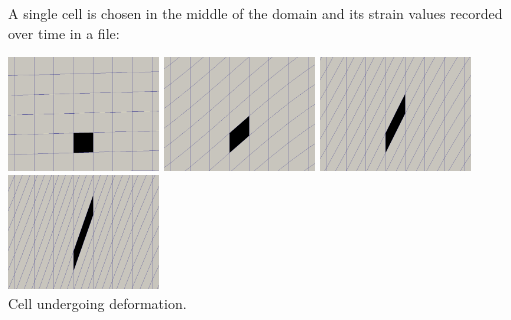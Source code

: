 A single cell is chosen in the middle of the domain and its strain values 
recorded over time in a file:
\begin{center}
\includegraphics[width=4cm]{python_codes/fieldstone_89/results/shearband/target0000.png}
\includegraphics[width=4cm]{python_codes/fieldstone_89/results/shearband/target0003.png}
\includegraphics[width=4cm]{python_codes/fieldstone_89/results/shearband/target0007.png}
\includegraphics[width=4cm]{python_codes/fieldstone_89/results/shearband/target0010.png}\\
{\captionfont Cell undergoing deformation.}
\end{center}

